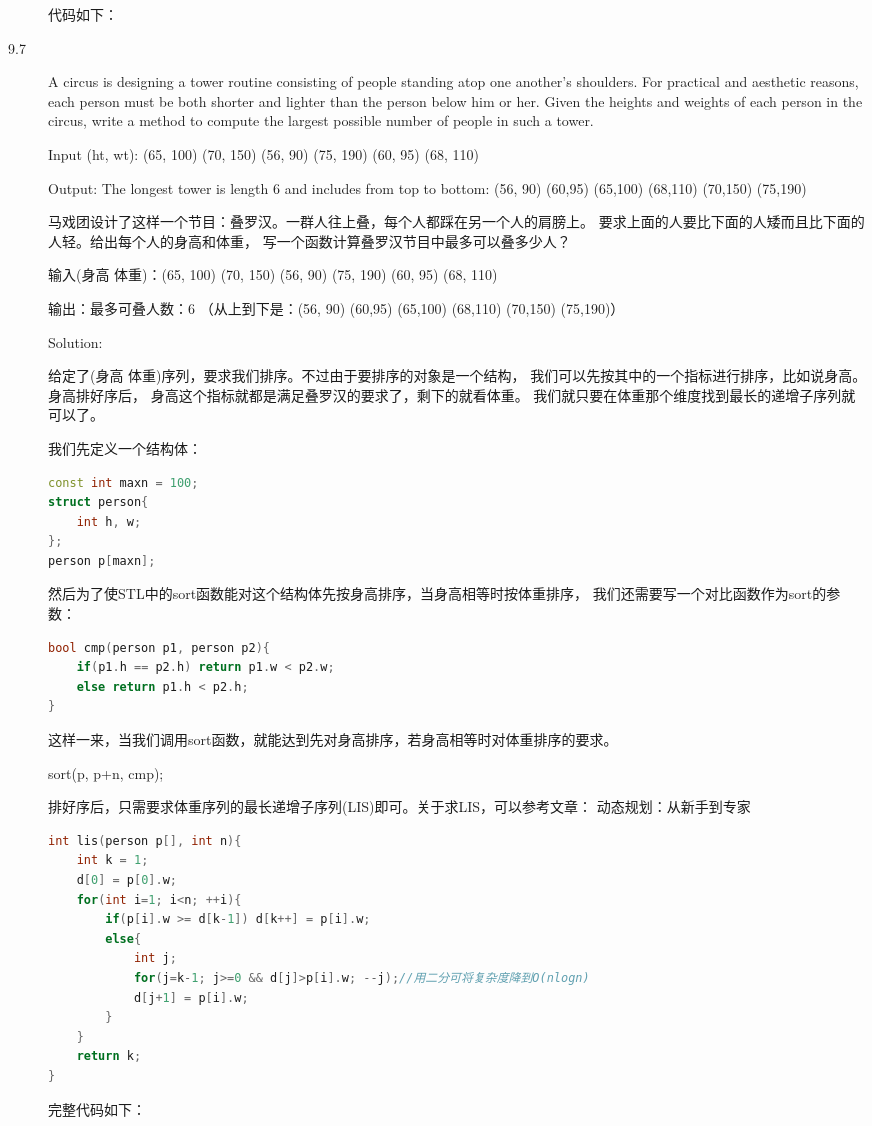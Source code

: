 \begin{description}
代码如下：



\item[9.7] A circus is designing a tower routine consisting of people standing atop one another’s shoulders. For practical and aesthetic reasons, each person must be both shorter and lighter than the person below him or her. Given the heights and weights of each person in the circus, write a method to compute the largest possible number of people in such a tower.

Input (ht, wt): (65, 100) (70, 150) (56, 90) (75, 190) (60, 95) (68, 110)

Output: The longest tower is length 6 and includes from top to bottom: (56, 90) (60,95) (65,100) (68,110) (70,150) (75,190)

马戏团设计了这样一个节目：叠罗汉。一群人往上叠，每个人都踩在另一个人的肩膀上。 要求上面的人要比下面的人矮而且比下面的人轻。给出每个人的身高和体重， 写一个函数计算叠罗汉节目中最多可以叠多少人？

输入(身高 体重)：(65, 100) (70, 150) (56, 90) (75, 190) (60, 95) (68, 110)

输出：最多可叠人数：6 （从上到下是：(56, 90) (60,95) (65,100) (68,110) (70,150) (75,190)）

Solution: 

给定了(身高 体重)序列，要求我们排序。不过由于要排序的对象是一个结构， 我们可以先按其中的一个指标进行排序，比如说身高。身高排好序后， 身高这个指标就都是满足叠罗汉的要求了，剩下的就看体重。 我们就只要在体重那个维度找到最长的递增子序列就可以了。

我们先定义一个结构体：
\begin{lstlisting}[language=C++]
const int maxn = 100;
struct person{
    int h, w;
};
person p[maxn];
\end{lstlisting}
然后为了使STL中的sort函数能对这个结构体先按身高排序，当身高相等时按体重排序， 我们还需要写一个对比函数作为sort的参数：
\begin{lstlisting}[language=C++]
bool cmp(person p1, person p2){
    if(p1.h == p2.h) return p1.w < p2.w;
    else return p1.h < p2.h;
}
\end{lstlisting}
这样一来，当我们调用sort函数，就能达到先对身高排序，若身高相等时对体重排序的要求。

sort(p, p+n, cmp);

排好序后，只需要求体重序列的最长递增子序列(LIS)即可。关于求LIS，可以参考文章： 动态规划：从新手到专家
\begin{lstlisting}[language=C++]
int lis(person p[], int n){
    int k = 1;
    d[0] = p[0].w;
    for(int i=1; i<n; ++i){
        if(p[i].w >= d[k-1]) d[k++] = p[i].w;
        else{
            int j;
            for(j=k-1; j>=0 && d[j]>p[i].w; --j);//用二分可将复杂度降到O(nlogn)
            d[j+1] = p[i].w;
        }
    }
    return k;
}
\end{lstlisting}
完整代码如下：


\end{description}
